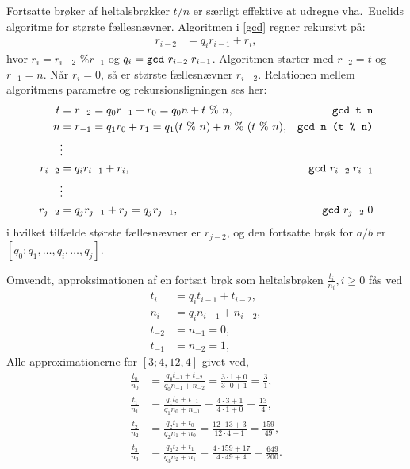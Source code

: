 \documentclass[a4paper,12pt]{article}
\begin{document}
Fortsatte brøker af heltalsbrøkker $t/n$ er særligt effektive at udregne vha.\ Euclids algoritme for største fællesnævner. Algoritmen i \ref{gcd} regner rekursivt på:
\begin{align}
  r_{i-2} &= q_i r_{i-1} + r_i,
\end{align}
hvor $r_i = r_{i-2}\text{ \% }r_{-1}$ og $q_i = \text{\texttt{gcd} } r_{i-2}\; r_{i-1}$. Algoritmen starter med $r_{-2} = t$ og $r_{-1}=n$. Når $r_i=0$, så er største fællesnævner $r_{i-2}$. Relationen mellem algoritmens parametre og rekursionsligningen ses her:
\begin{align}
  t &= r_{-2} = q_0 r_{-1} + r_0 = q_0 n + t\text{ \% }n, & \text{\texttt{gcd t n}}
  \\n &= r_{-1} = q_1 r_0 + r_1 = q_1 (t\text{ \% }n) + n\text{ \% }(t\text{ \% }n), & \text{\texttt{gcd n (t \% n)}}
  \\&\vdots\nonumber
  \\ r_{i-2} &= q_i r_{i-1} + r_i, & \text{\texttt{gcd} }r_{i-2}\;r_{i-1}
  \\&\vdots\nonumber
  \\r_{j-2} &= q_j r_{j-1} + r_j = q_j r_{j-1}, & \text{\texttt{gcd} }r_{j-2}\;0
\end{align}
i hvilket tilfælde største fællesnævner er $r_{j-2}$, og den fortsatte brøk for $a/b$ er $[q_0; q_1, \ldots, q_i, \ldots, q_j]$.

Omvendt, approksimationen af en fortsat brøk som heltalsbrøken $\frac{t_i}{n_i}, i \geq 0$ fås ved
\begin{align}
  t_i &= q_it_{i-1}+t_{i-2},
  \\n_i &= q_in_{i-1}+n_{i-2},
  \\t_{-2} &= n_{-1} = 0,
  \\t_{-1} &= n_{-2} =1,
\end{align}
Alle approximationerne for $[3; 4, 12, 4]$ givet ved,
\begin{align}
  \frac{t_0}{n_0} &= \frac{q_0t_{-1} + t_{-2}}{q_0n_{-1}+n_{-2}} = \frac{3\cdot 1+0}{3\cdot 0 + 1} = \frac{3}{1},
  \\\frac{t_1}{n_1} &= \frac{q_1t_0 + t_{-1}}{q_1n_0+n_{-1}} = \frac{4\cdot 3 + 1}{4\cdot 1+0} = \frac{13}{4},
  \\\frac{t_2}{n_2} &= \frac{q_2t_1 + t_{0}}{q_2n_1+n_{0}} = \frac{12\cdot 13 + 3}{12\cdot 4 + 1} = \frac{159}{49},
  \\\frac{t_3}{n_3} &= \frac{q_3t_2 + t_{1}}{q_3n_2+n_{1}} = \frac{4\cdot 159 + 17}{4\cdot 49+4} = \frac{649}{200}.
\end{align}
\end{document}
